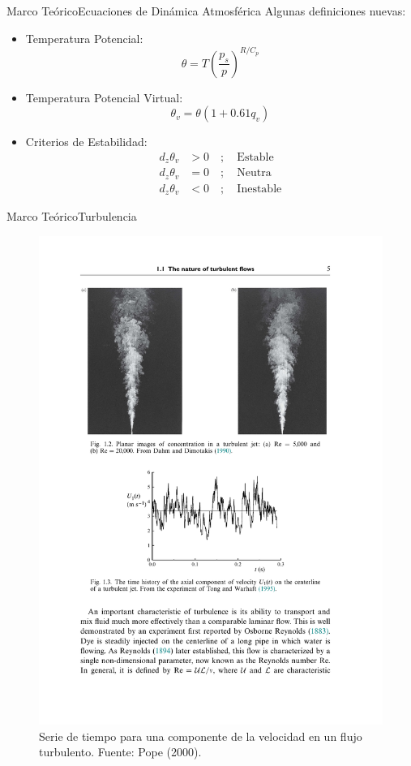 \documentclass[mathserif,10pt]{beamer}
\newcommand{\be}{\begin{equation}}
\newcommand{\ee}{\end{equation}}
\begin{document}
\begin{frame}{Marco Teórico}{Ecuaciones de Dinámica Atmosférica}
	Algunas definiciones nuevas:
	\begin{itemize}
		\item Temperatura Potencial:
		\be \theta = T\left( \frac{p_s}{p} \right)^{R/C_p} \ee
		\item Temperatura Potencial Virtual:
		\be \theta_v = \theta(1+0.61q_v) \ee
		\item Criterios de Estabilidad:
		\begin{align}
		d_z \theta_v &> 0\quad;\quad\text{Estable}\label{eq:03_esta1}\\
		d_z \theta_v &= 0\quad;\quad\text{Neutra} \label{eq:03_esta2}\\
		d_z \theta_v &< 0\quad;\quad\text{Inestable} \label{eq:03_esta3}
		\end{align}
	\end{itemize}
\end{frame}
%


\begin{frame}{Marco Teórico}{Turbulencia}
	\begin{figure}[h!]
		\centering
		\includegraphics[width=0.8\linewidth,trim={4.3cm 7.7cm 4cm 11.5cm},clip]{fig/03/turbulent}
		\caption{Serie de tiempo para una componente de la velocidad en un flujo turbulento. Fuente: Pope (2000).}
		\label{fig:03_turbulent}
	\end{figure}
\end{frame}
\end{document}
